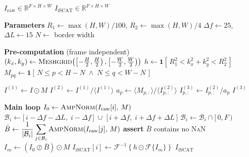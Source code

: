 \begin{algorithm}[H]
\caption{Raw image stack $\rightarrow$ iSCAT contrast stack}
\label{alg:raw2iscat}
\begin{algorithmic}[1]
 
\Require $I_{\mathrm{raw}} \in \mathbb{R}^{F \times H \times W}$ 
\Ensure  $I_{\mathrm{iSCAT}} \in \mathbb{R}^{F \times H \times W}$
\Statex
 
\Statex \textbf{Parameters}
\State $R_1 \gets \max(H,W)/100$, \quad $R_2 \gets \max(H,W)/4$ 
\State $\Delta f \gets 25$, \quad $\Delta L \gets 15$ 
\State $N \gets$ border width 
\Statex
 
\Statex \textbf{Pre-computation} (frame independent)
\State $(k_x, k_y) \gets \textsc{Meshgrid}\!\left(\left[-\tfrac{H}{2}, \tfrac{H}{2}\right), \left[-\tfrac{W}{2}, \tfrac{W}{2}\right)\right)$ 
\State $h \gets \mathbf{1}\!\left[\, R_1^{2} < k_x^{2} + k_y^{2} < R_2^{2} \,\right]$ 
\State $M_{pq} \gets \mathbf{1}\!\left[\, N \le p < H-N \;\wedge\; N \le q < W-N \,\right]$ 
\Statex
 
 
    \State $I^{(1)} \gets I \odot M$ 
    \State $I^{(2)} \gets I^{(1)} / \big\langle I^{(1)} \big\rangle$ 
        \State $a_p \gets \big\langle M_{p,:} \big\rangle \big/ \big\langle I^{(2)}_{p,:} \big\rangle$ 
        \State $I^{(3)}_{p,:} \gets I^{(2)}_{p,:} \big/ a_p$
    \EndFor
    \State \Return $I^{(3)}$
\EndFunction
\Statex
 
\Statex \textbf{Main loop}
    \State $I_0 \gets \textsc{AmpNorm}\!\left(I_{\mathrm{raw}}[i],\, M\right)$ 
    \Statex
    \State $\mathcal{B}_i \gets
        \big[\, i - \Delta f - \Delta L,\; i - \Delta f \,\big] \;\cup\;
        \big[\, i + \Delta f,\; i + \Delta f + \Delta L \,\big]$
    \State $\mathcal{B}_i \gets \mathcal{B}_i \cap [\,0, F\,)$ 
    \State $\bar{B} \gets \dfrac{1}{|\mathcal{B}_i|} \displaystyle\sum_{j \in \mathcal{B}_i}
        \textsc{AmpNorm}\!\left(I_{\mathrm{raw}}[j],\, M\right)$ 
    \State \textbf{assert} $\bar{B}$ contains no \textsc{NaN}
    \Statex
    \State $I_m \gets \left( I_0 \oslash \bar{B} \right) \odot M$ 
    \State $I_{\mathrm{iSCAT}}[i] \gets \mathcal{F}^{-1}\!\left\{ h \odot \mathcal{F}\{ I_m \} \right\}$ 
\EndFor
\Statex
\State \Return $I_{\mathrm{iSCAT}}$
 
\end{algorithmic}
\end{algorithm}


